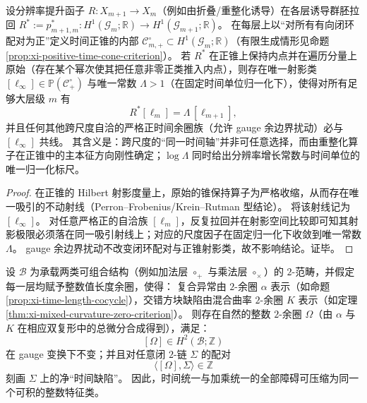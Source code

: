\begin{theorem}\label{thm:xi-scale-coherent-time-pf-rigidity}
设分辨率提升函子 \(R:X_{m+1}\to X_m\)（例如由折叠/重整化诱导）在各层诱导群胚拉回
\(
R^\ast:=p_{m+1,m}^\ast:H^1(\mathcal G_m;\mathbb R)\to H^1(\mathcal G_{m+1};\mathbb R)
\)。
在每层上以“对所有有向闭环配对为正”定义时间正锥的内部 \( \mathcal C_{m,+}^\circ\subset H^1(\mathcal G_m;\mathbb R)\)（有限生成情形见命题 \ref{prop:xi-positive-time-cone-criterion}）。
若 \(R^\ast\) 在正锥上保持内点并在遍历分量上原始（存在某个幂次使其把任意非零正类推入内点），则存在唯一射影类 \([\ell_\infty]\in \mathbb P(\mathcal C_{+}^\circ)\) 与唯一常数 \(\Lambda>1\)（在固定时间单位归一化下），使得对所有足够大层级 \(m\) 有
\[
R^\ast[\ell_m]=\Lambda\,[\ell_{m+1}],
\]
并且任何其他跨尺度自洽的严格正时间余圈族（允许 gauge 余边界扰动）必与 \([\ell_\infty]\) 共线。
其含义是：跨尺度的“同一时间轴”并非可任意选择，而由重整化算子在正锥中的主本征方向刚性确定；\(\log\Lambda\) 同时给出分辨率增长常数与时间单位的唯一归一化标尺。
\end{theorem}
\begin{proof}
在正锥的 Hilbert 射影度量上，原始的锥保持算子为严格收缩，从而存在唯一吸引的不动射线（Perron--Frobenius/Krein--Rutman 型结论）。
将该射线记为 \([\ell_\infty]\)。
对任意严格正的自洽族 \([\ell_m]\)，反复拉回并在射影空间比较即可知其射影极限必须落在同一吸引射线上；对应的尺度因子在固定归一化下收敛到唯一常数 \(\Lambda\)。
gauge 余边界扰动不改变闭环配对与正锥射影类，故不影响结论。证毕。
\end{proof}

\begin{theorem}\label{thm:xi-time-characteristic-class-integrality}
设 \(\mathcal B\) 为承载两类可组合结构（例如加法层 \(\circ_+\) 与乘法层 \(\circ_\times\)）的 \(2\)-范畴，并假定每一层均赋予整数值长度余圈，使得：
复合异常由 \(2\)-余圈 \(\alpha\) 表示（如命题 \ref{prop:xi-time-length-cocycle}），交错方块缺陷由混合曲率 \(2\)-余圈 \(K\) 表示（如定理 \ref{thm:xi-mixed-curvature-zero-criterion}）。
则存在自然的整数 \(2\)-余圈 \(\Omega\)（由 \(\alpha\) 与 \(K\) 在相应双复形中的总微分合成得到），满足：
\[
[\Omega]\in H^2(\mathcal B;\mathbb Z)
\]
在 gauge 变换下不变；并且对任意闭 \(2\)-链 \(\Sigma\) 的配对
\[
\langle[\Omega],\Sigma\rangle\in\mathbb Z
\]
刻画 \(\Sigma\) 上的净“时间缺陷”。
因此，时间统一与加乘统一的全部障碍可压缩为同一个可积的整数特征类。
\end{theorem}

